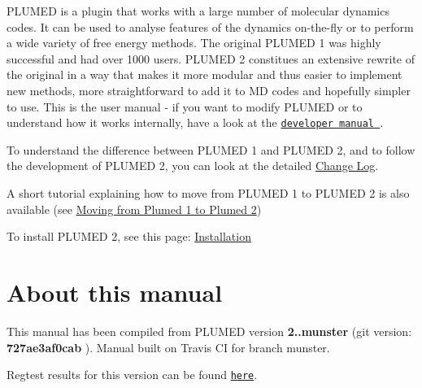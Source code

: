 P\+L\+U\+M\+E\+D is a plugin that works with a large number of molecular dynamics codes. It can be used to analyse features of the dynamics on-\/the-\/fly or to perform a wide variety of free energy methods. The original P\+L\+U\+M\+E\+D 1 \cite{plumed1} was highly successful and had over 1000 users. P\+L\+U\+M\+E\+D 2 \cite{plumed2} constitues an extensive rewrite of the original in a way that makes it more modular and thus easier to implement new methods, more straightforward to add it to M\+D codes and hopefully simpler to use. This is the user manual -\/ if you want to modify P\+L\+U\+M\+E\+D or to understand how it works internally, have a look at the \href{../../developer-doc/html/index.html}{\tt developer manual }.



To understand the difference between P\+L\+U\+M\+E\+D 1 and P\+L\+U\+M\+E\+D 2, and to follow the development of P\+L\+U\+M\+E\+D 2, you can look at the detailed \hyperlink{_changelog}{Change Log}.

A short tutorial explaining how to move from P\+L\+U\+M\+E\+D 1 to P\+L\+U\+M\+E\+D 2 is also available (see \hyperlink{moving}{Moving from Plumed 1 to Plumed 2})

To install P\+L\+U\+M\+E\+D 2, see this page\+: \hyperlink{_installation}{Installation}\hypertarget{index_AboutManual}{}\section{About this manual}\label{index_AboutManual}
This manual has been compiled from P\+L\+U\+M\+E\+D version {\bfseries  2..\+munster } (git version\+: {\bfseries  727ae3af0cab }). Manual built on Travis C\+I for branch munster.

Regtest results for this version can be found \href{../regtests/report.html}{\tt here}.

